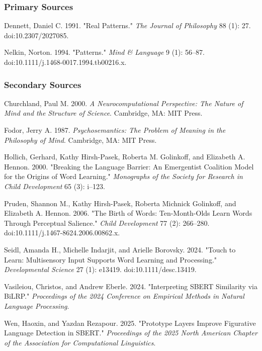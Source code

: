 \documentclass[12pt]{article}
\newenvironment{CSLReferences}[2]%
  {\begin{enumerate}[label={[\arabic*]}, leftmargin=100pt, labelwidth=*, labelsep=0.5em, itemsep=5pt]%
   \raggedright\sloppy}%
  {\end{enumerate}}
\begin{document}
\subsubsection*{Primary Sources}
\begin{CSLReferences}{1}{0}
Dennett, Daniel C. 1991. "Real Patterns." \emph{The Journal of Philosophy} 88 (1): 27. doi:10.2307/2027085.

Nelkin, Norton. 1994. "Patterns." \emph{Mind \& Language} 9 (1): 56–87. doi:10.1111/j.1468-0017.1994.tb00216.x.
\end{CSLReferences}

\subsubsection*{Secondary Sources}
\begin{CSLReferences}{1}{0}
Churchland, Paul M. 2000. \emph{A Neurocomputational Perspective: The Nature of Mind and the Structure of Science}. Cambridge, MA: MIT Press.

Fodor, Jerry A. 1987. \emph{Psychosemantics: The Problem of Meaning in the Philosophy of Mind}. Cambridge, MA: MIT Press.

Hollich, Gerhard, Kathy Hirsh-Pasek, Roberta M. Golinkoff, and Elizabeth A. Hennon. 2000. "Breaking the Language Barrier: An Emergentist Coalition Model for the Origins of Word Learning." \emph{Monographs of the Society for Research in Child Development} 65 (3): i–123.

Pruden, Shannon M., Kathy Hirsh-Pasek, Roberta Michnick Golinkoff, and Elizabeth A. Hennon. 2006. "The Birth of Words: Ten-Month-Olds Learn Words Through Perceptual Salience." \emph{Child Development} 77 (2): 266–280. doi:10.1111/j.1467-8624.2006.00862.x.

Seidl, Amanda H., Michelle Indarjit, and Arielle Borovsky. 2024. "Touch to Learn: Multisensory Input Supports Word Learning and Processing." \emph{Developmental Science} 27 (1): e13419. doi:10.1111/desc.13419.

Vasileiou, Christos, and Andrew Eberle. 2024. "Interpreting SBERT Similarity via BiLRP." \emph{Proceedings of the 2024 Conference on Empirical Methods in Natural Language Processing}.

Wen, Haoxin, and Yazdan Rezapour. 2025. "Prototype Layers Improve Figurative Language Detection in SBERT." \emph{Proceedings of the 2025 North American Chapter of the Association for Computational Linguistics}.
\end{CSLReferences}
\end{document}
